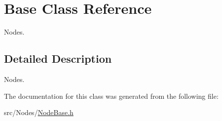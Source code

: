 \hypertarget{class_base}{}\section{Base Class Reference}
\label{class_base}


Nodes.  




\subsection{Detailed Description}
Nodes. 

The documentation for this class was generated from the following file\+:\begin{DoxyCompactItemize}
\item 
src/\+Nodes/\hyperlink{_node_base_8h}{Node\+Base.\+h}\end{DoxyCompactItemize}

